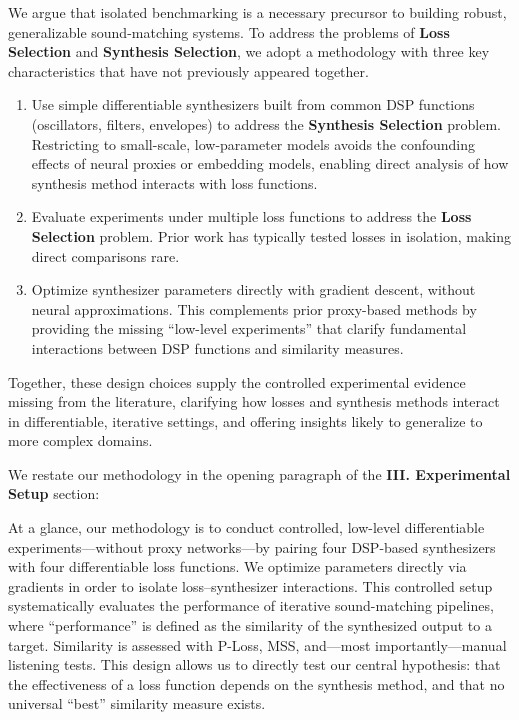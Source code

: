 \documentclass[11pt]{article}
\newcommand{\LossSelect}{\textbf{Loss Selection}}
\newcommand{\SynthSelect}{\textbf{Synthesis Selection}}
\begin{document}
\begin{displayquote}
    We argue that isolated benchmarking is a necessary precursor to building robust, generalizable sound-matching systems. To address the problems of \LossSelect{} and \SynthSelect{}, we adopt a methodology with three key characteristics that have not previously appeared together.

\begin{enumerate}
    \item Use simple differentiable synthesizers built from common DSP functions (oscillators, filters, envelopes) to address the \SynthSelect{} problem. Restricting to small-scale, low-parameter models avoids the confounding effects of neural proxies or embedding models, enabling direct analysis of how synthesis method interacts with loss functions. 
    \item Evaluate experiments under multiple loss functions to address the \LossSelect{} problem. Prior work has typically tested losses in isolation, making direct comparisons rare\cite{vahidi2023mesostructures}.  
    \item Optimize synthesizer parameters directly with gradient descent, without neural approximations. This complements prior proxy-based methods by providing the missing “low-level experiments” that clarify fundamental interactions between DSP functions and similarity measures. 
\end{enumerate}

Together, these design choices supply the controlled experimental evidence missing from the literature, 
clarifying how losses and synthesis methods interact in differentiable, iterative settings, 
and offering insights likely to generalize to more complex domains.

\end{displayquote}


\medskip
\noindent We restate our methodology in the opening paragraph of the \textbf{III. Experimental Setup} section:

\begin{displayquote}
    At a glance, our methodology is to conduct controlled, low-level differentiable experiments—without proxy networks—by pairing four DSP-based synthesizers with four differentiable loss functions. We optimize parameters directly via gradients in order to isolate loss–synthesizer interactions. This controlled setup systematically evaluates the performance of iterative sound-matching pipelines, where “performance” is defined as the similarity of the synthesized output to a target. Similarity is assessed with P-Loss, MSS, and—most importantly—manual listening tests. This design allows us to directly test our central hypothesis: that the effectiveness of a loss function depends on the synthesis method, and that no universal “best” similarity measure exists.
\end{displayquote}
\end{document}
